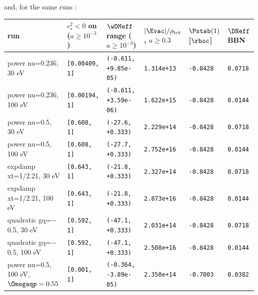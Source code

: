 \begin{landscape}
\noindent and, for the same runs :

{\scriptsize
\setlength{\tabcolsep}{5pt}
\begin{longtable}{@{}llllll@{}}
\toprule
run & $c_s^2<0$ on ($a\geq10^{-3}$) & $\wDMeff$ range ($a\geq10^{-3}$) & $|\Evac|/\rho_{\mathrm{tot}}$, $a\geq0.3$ & $\Pstab(1)$ [$\rhoc$] & $\DNeff$ BBN \tabularnewline
\midrule
\endhead
power nu=0.236, 30 eV & \texttt{[0.00409, 1]} & \texttt{(-0.611, +9.85e-05)} & \texttt{1.314e+13} & \texttt{-0.8428} & \texttt{0.0718} \tabularnewline
power nu=0.236, 100 eV & \texttt{[0.00194, 1]} & \texttt{(-0.611, +3.59e-06)} & \texttt{1.622e+15} & \texttt{-0.8428} & \texttt{0.0144} \tabularnewline
power nu=0.5, 30 eV & \texttt{[0.608, 1]} & \texttt{(-27.6, +0.333)} & \texttt{2.229e+14} & \texttt{-0.8428} & \texttt{0.0718} \tabularnewline
power nu=0.5, 100 eV & \texttt{[0.608, 1]} & \texttt{(-27.7, +0.333)} & \texttt{2.752e+16} & \texttt{-0.8428} & \texttt{0.0144} \tabularnewline
expdamp xt=1/2.21, 30 eV & \texttt{[0.643, 1]} & \texttt{(-21.8, +0.333)} & \texttt{2.327e+14} & \texttt{-0.8428} & \texttt{0.0718} \tabularnewline
expdamp xt=1/2.21, 100 eV & \texttt{[0.643, 1]} & \texttt{(-21.8, +0.333)} & \texttt{2.873e+16} & \texttt{-0.8428} & \texttt{0.0144} \tabularnewline
quadratic gq=$-$0.5, 30 eV & \texttt{[0.592, 1]} & \texttt{(-47.1, +0.333)} & \texttt{2.031e+14} & \texttt{-0.8428} & \texttt{0.0718} \tabularnewline
quadratic gq=$-$0.5, 100 eV & \texttt{[0.592, 1]} & \texttt{(-47.1, +0.333)} & \texttt{2.508e+16} & \texttt{-0.8428} & \texttt{0.0144} \tabularnewline
power nu=0.5, 100 eV, $\Omegaqp=0.55$ & \texttt{[0.001, 1]} & \texttt{(-0.364, -3.89e-05)} & \texttt{2.350e+14} & \texttt{-0.7003} & \texttt{0.0382} \tabularnewline
\bottomrule
\end{longtable}
}
\end{landscape}

